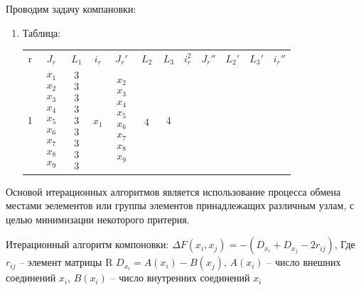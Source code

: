 \documentclass{article}
\begin{document}
	Проводим задачу компановки:
	\begin{enumerate}
		\item Таблица:

			\begin{tabular}{cccccccccccc}
				r & $J_r$ & $L_1$ & $i_r$ & $J_r'$ & $L_2$ & $L_3$ & $i_r^2$ & $J_r''$ & $L_2'$ & $L_3'$ & $i_r''$\\
				1 &
				$
				\begin{array}{c}
				x_1 \\ x_2 \\ x_3 \\ x_4 \\ x_5 \\ x_6 \\ x_7 \\ x_8 \\ x_9
				\end{array}
				$
				&
				$
				\begin{array}{c}
				3 \\ 3 \\ 3 \\ 3 \\ 3 \\ 3 \\ 3 \\ 3 \\ 3 
				\end{array}
				$
				& $x_1$ & 
				$
				\begin{array}{c}
				x_2 \\ x_3 \\ x_4 \\ x_5 \\ x_6 \\ x_7 \\ x_8 \\ x_9
				\end{array}
				$
				&
				$
				\begin{array}{c}
				4
				\end{array}
				$ & 4
			\end{tabular}
	\end{enumerate}

	Основой итерационных алгоритмов является использование процесса обмена местами эелементов или группы элементов принадлежащих различным узлам, с целью минимизации некоторого притерия.
	
	Итерационный алгоритм компоновки:
	$
	\Delta F (x_i, x_j) = - (D_{x_i} + D_{x_j} - 2 r_{ij})
	$, Где $r_{ij}$ -- элемент матрицы R
	$D_{x_i} = A (x_i) - B (x_j)$, $A(x_i)$ -- число внешних соединений $x_i$, $B(x_i)$ -- число внутренних соединений $x_i$
	
\end{document}

